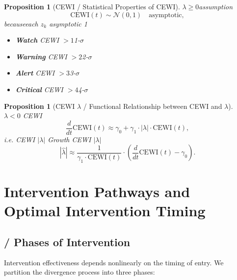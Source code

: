 \documentclass[11pt,a4paper]{article}
\newtheorem{proposition}[theorem]{Proposition}
\theoremstyle{remark}
\newcommand{\paren}[1]{\left(#1\right)}
\newcommand{\lambdaparam}{\lambda}
\begin{document}
\begin{proposition}[CEWI  / Statistical Properties of CEWI]
\label{prop:CEWI_stats}
 $\lambdaparam \geq 0$assumption
\[
\text{CEWI}(t) \sim \mathcal{N}(0, 1) \quad \text{asymptotic},
\]
becauseeach $z_k$ asymptotic 1

\begin{itemize}
    \item \textbf{Watch} CEWI $> 1$1-$\sigma$ 
    \item \textbf{Warning} CEWI $> 2$2-$\sigma$ 
    \item \textbf{Alert} CEWI $> 3$3-$\sigma$ 
    \item \textbf{Critical} CEWI $> 4$4-$\sigma$ 
\end{itemize}
\end{proposition}

\begin{proposition}[CEWI  $\lambdaparam$  / Functional Relationship between CEWI and $\lambdaparam$]
\label{prop:CEWI_lambda}
 $\lambdaparam < 0$ CEWI 
\[
\frac{d}{dt} \text{CEWI}(t) \approx \gamma_0 + \gamma_1 \cdot |\lambdaparam| \cdot \text{CEWI}(t),
\]
i.e. CEWI  $|\lambdaparam|$ Growth
 CEWI  $|\lambdaparam|$ 
\[
|\widehat{\lambdaparam}| \approx \frac{1}{\gamma_1 \cdot \text{CEWI}(t)} 
\cdot \paren{\frac{d}{dt} \text{CEWI}(t) - \gamma_0}.
\]
\end{proposition}

\section{}
\section{Intervention Pathways and Optimal Intervention Timing}

\subsection{ / Phases of Intervention}



Intervention effectiveness depends nonlinearly on the timing of entry.
We partition the divergence process into three phases:
\end{document}
